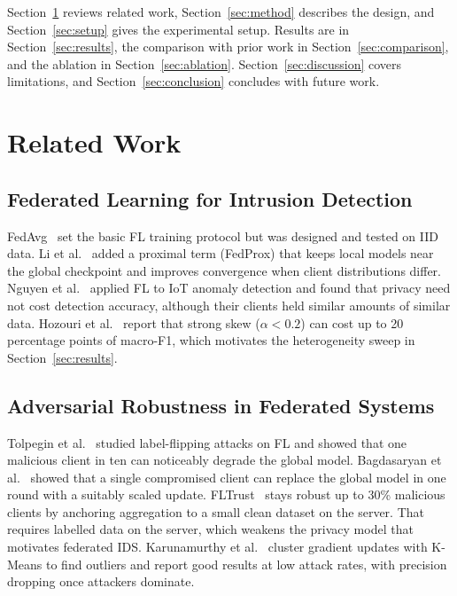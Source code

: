 \documentclass[iicol,Numbered]{sn-jnl}
\begin{document}
Section~\ref{sec:related} reviews related work, Section~\ref{sec:method}
describes the design, and Section~\ref{sec:setup} gives the experimental setup.
Results are in Section~\ref{sec:results}, the comparison with prior work in
Section~\ref{sec:comparison}, and the ablation in Section~\ref{sec:ablation}.
Section~\ref{sec:discussion} covers limitations, and
Section~\ref{sec:conclusion} concludes with future work.

\section{Related Work}\label{sec:related}

\subsection{Federated Learning for Intrusion Detection}

FedAvg~\cite{mcmahan2017} set the basic FL training protocol but was designed
and tested on IID data. Li et al.~\cite{li2020federated} added a proximal term
(FedProx) that keeps local models near the global checkpoint and improves
convergence when client distributions differ. Nguyen et al.~\cite{nguyen2019}
applied FL to IoT anomaly detection and found that privacy need not cost
detection accuracy, although their clients held similar amounts of similar
data. Hozouri et al.~\cite{hozouri2023} report that strong skew
($\alpha<0.2$) can cost up to 20 percentage points of macro-F1, which motivates
the heterogeneity sweep in Section~\ref{sec:results}.

\subsection{Adversarial Robustness in Federated Systems}

Tolpegin et al.~\cite{tolpegin2020} studied label-flipping attacks on FL and
showed that one malicious client in ten can noticeably degrade the global model.
Bagdasaryan et al.~\cite{bagdasaryan2020} showed that a single compromised
client can replace the global model in one round with a suitably scaled update.
FLTrust~\cite{cao2021fltrust} stays robust up to 30\% malicious clients by
anchoring aggregation to a small clean dataset on the server. That requires
labelled data on the server, which weakens the privacy model that motivates
federated IDS. Karunamurthy et al.~\cite{karunamurthy2023} cluster gradient
updates with K-Means to find outliers and report good results at low attack
rates, with precision dropping once attackers dominate.
\end{document}
